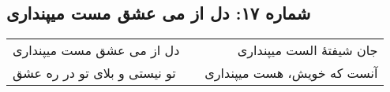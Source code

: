\begin{center}
\section*{شماره ۱۷: دل از می عشق مست میپنداری}
\label{sec:017}
\begin{longtable}{l p{0.5cm} r}
دل از می عشق مست میپنداری
&&
جان شیفتهٔ الست میپنداری
\\
تو نیستی و بلای تو در ره عشق
&&
آنست که خویش، هست میپنداری
\\
\end{longtable}
\end{center}
